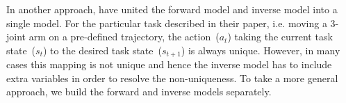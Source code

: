 

In another approach, \citet{petkos2006learning} have united the
forward model and inverse model into
a single model. For the particular task described in their paper, i.e. moving a 3-joint arm on a pre-defined trajectory,
the action~($a_t$) taking the current task state~($s_t$) to the
desired task state~($s_{t+1}$) is always unique. However, in many
cases this mapping is not unique and hence the inverse model has to
include extra variables in order to resolve the non-uniqueness. To
take a more general approach, we build the forward and inverse models
separately. %

